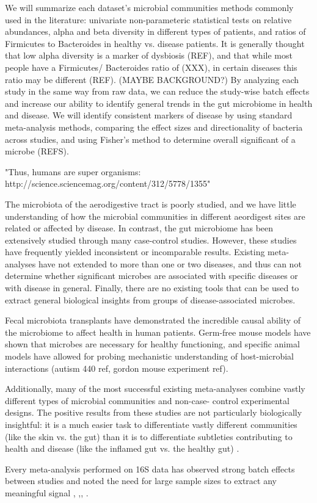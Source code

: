 \documentclass[12pt]{article}
\begin{document}
We will summarize each dataset's microbial communities
methods commonly used in the 
literature: univariate non-parameteric statistical tests on relative 
abundances, alpha and beta diversity in different types of patients, 
and ratios of Firmicutes to Bacteroides in healthy vs. disease 
patients. It is generally thought that low alpha diversity is a marker 
of dysbiosis (REF), and that while most people have a Firmicutes/
Bacteroides ratio of (XXX), in certain diseases this ratio may be 
different (REF). (MAYBE BACKGROUND?) By analyzing each study in the 
same way from raw data, we can reduce the study-wise batch effects and 
increase our ability to identify general trends in the gut microbiome 
in health and disease. We will identify consistent markers of disease 
by using standard meta-analysis methods, comparing the effect sizes 
and directionality of bacteria across studies, and using Fisher's 
method to determine overall significant of a microbe (REFS). 

"Thus, humans are super organisms: http://science.sciencemag.org/content/312/5778/1355"

The microbiota of 
the aerodigestive tract is poorly studied, and we have little understanding 
of how the microbial communities in different aeordigest sites are related or 
affected by disease. In contrast, the gut microbiome has 
been extensively studied through many case-control studies. 
However, these studies have frequently yielded inconsistent or incomparable 
results. Existing meta-analyses have not extended to more than one or two 
diseases, and thus can not determine whether significant microbes are 
associated with specific diseases or with disease in general. 
Finally, there are no existing tools that can be used to extract general 
biological insights from groups of disease-associated microbes.

Fecal microbiota transplants have demonstrated the incredible
causal ability of the microbiome to affect health in 
human patients. Germ-free mouse models have shown that microbes are
necessary for healthy functioning, and specific animal models have  
allowed for probing mechanistic understanding of host-microbial 
interactions (autism 440 ref, gordon mouse experiment ref). 

Additionally, many of the most successful existing meta-analyses 
combine vastly different types of microbial communities and non-case-
control experimental designs. The positive results from these studies 
are not particularly biologically insightful: it is a much easier task 
to differentiate vastly different communities (like the skin vs. the 
gut) than it is to differentiate subtleties contributing to health and 
disease (like the inflamed gut vs. the healthy gut) \cite{knights-supervised-2010}.

Every meta-analysis performed on 16S data has observed 
strong batch effects between studies and noted the need for large 
sample sizes to extract any meaningful signal \cite{sze-signal-2016},
\cite{walters-ob_meta-2014},\cite{knights-supervised-2010},
\cite{lozupone-meta-2013}. 





\end{document}
